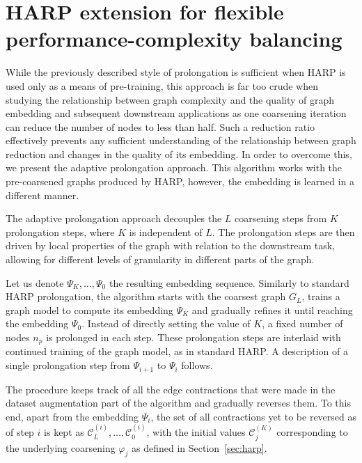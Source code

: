 \section{HARP extension for flexible performance-complexity balancing}\label{sec:our-method}

While the previously described style of prolongation is sufficient when HARP is used only as a means of pre-training, this approach is far too crude when studying the relationship between graph complexity and the quality of graph embedding and subsequent downstream applications as one coarsening iteration can reduce the number of nodes to less than half. Such a reduction ratio effectively prevents any sufficient understanding of the relationship between graph reduction and changes in the quality of its embedding. In order to overcome this, we present the adaptive prolongation approach. This algorithm works with the pre-coarsened graphs produced by HARP, however, the embedding is learned in a different manner.

The adaptive prolongation approach decouples the \( L \) coarsening steps from \( K \) prolongation steps, where \( K \) is independent of \( L \). The prolongation steps are then driven by local properties of the graph with relation to the downstream task, allowing for different levels of granularity in different parts of the graph.

Let us denote \( \Psi_K, \dots, \Psi_0 \) the resulting embedding sequence. Similarly to standard HARP prolongation, the algorithm starts with the coarsest graph \( G_L \), trains a graph model to compute its embedding \( \Psi_K \) and gradually refines it until reaching the embedding \( \Psi_0 \). Instead of directly setting the value of \( K \), a fixed number of nodes \( n_p \) is prolonged in each step. These prolongation steps are interlaid with continued training of the graph model, as in standard HARP. A description of a single prolongation step from \( \Psi_{i + 1} \) to \( \Psi_i \) follows.

The procedure keeps track of all the edge contractions that were made in the dataset augmentation part of the algorithm and gradually reverses them. To this end, apart from the embedding \( \Psi_i \), the set of all contractions yet to be reversed as of step \( i \) is kept as \( \mathcal{C}_L^{(i)}, \dots, \mathcal{C}_0^{(i)} \), with the initial values \( \mathcal{C}_j^{(K)} \) corresponding to the underlying coarsening \( \varphi_j \) as defined in Section~\ref{sec:harp}.

